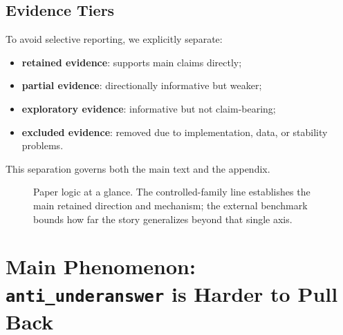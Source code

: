 \documentclass[11pt]{article}
\begin{document}
\subsection{Evidence Tiers}

To avoid selective reporting, we explicitly separate:
\begin{itemize}
    \item \textbf{retained evidence}: supports main claims directly;
    \item \textbf{partial evidence}: directionally informative but weaker;
    \item \textbf{exploratory evidence}: informative but not claim-bearing;
    \item \textbf{excluded evidence}: removed due to implementation, data, or stability problems.
\end{itemize}
This separation governs both the main text and the appendix.

\begin{figure}[t]
\centering
{}
\caption{Paper logic at a glance. The controlled-family line establishes the main retained direction and mechanism; the external benchmark bounds how far the story generalizes beyond that single axis.}
\label{fig:paper-map}
\end{figure}

\section{Main Phenomenon: \texttt{anti\_underanswer} is Harder to Pull Back}
\label{sec:phenomenon}
\end{document}
